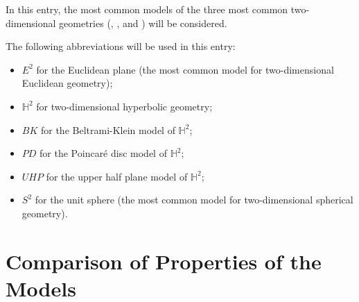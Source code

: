 \documentclass[12pt]{article}
\begin{document}

In this entry, the most common models of the three most common two-dimensional geometries (, , and ) will be considered.

The following abbreviations will be used in this entry:

\begin{itemize}
\item $E^2$ for the Euclidean plane (the most common model for two-dimensional Euclidean geometry);
\item $\mathbb{H}^2$ for two-dimensional hyperbolic geometry;
\item $BK$ for the Beltrami-Klein model of $\mathbb{H}^2$;
\item $PD$ for the Poincar\'e disc model of $\mathbb{H}^2$;
\item $UHP$ for the upper half plane model of $\mathbb{H}^2$;
\item $S^2$ for the unit sphere (the most common model for two-dimensional spherical geometry).
\end{itemize}

\section{Comparison of Properties of the Models}
\end{document}
